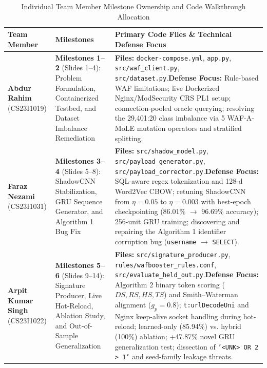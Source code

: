 \documentclass[conference]{IEEEtran}
\begin{document}
\begin{table}[t]
\centering
\caption{Individual Team Member Milestone Ownership and Code Walkthrough Allocation}
\label{tab:contributions}
\scriptsize
\begin{tabular}{L{3.2cm}L{5.2cm}L{8.4cm}}
\toprule
Team Member & Milestones & Primary Code Files \& Technical Defense Focus\\
\midrule
\textbf{Abdur Rahim} (CS23I1019) & \textbf{Milestones 1--2} (Slides 1--4): Problem Formulation, Containerized Testbed, and Dataset Imbalance Remediation & \textbf{Files:} \texttt{docker-compose.yml}, \texttt{app.py}, \texttt{src/waf\_client.py}, \texttt{src/dataset.py}.\newline \textbf{Defense Focus:} Rule-based WAF limitations; live Dockerized Nginx/ModSecurity CRS PL1 setup; connection-pooled oracle querying; resolving the 29,401:20 class imbalance via 5 WAF-A-MoLE mutation operators and stratified splitting.\\
\midrule
\textbf{Faraz Nezami} (CS23I1031) & \textbf{Milestones 3--4} (Slides 5--8): ShadowCNN Stabilization, GRU Sequence Generator, and Algorithm 1 Bug Fix & \textbf{Files:} \texttt{src/shadow\_model.py}, \texttt{src/payload\_generator.py}, \texttt{src/payload\_corrector.py}.\newline \textbf{Defense Focus:} SQL-aware regex tokenization and 128-d Word2Vec CBOW; retuning ShadowCNN from $\eta=0.05$ to $\eta=0.003$ with best-epoch checkpointing (86.01\% $\to$ 96.69\% accuracy); 256-unit GRU training; discovering and repairing the Algorithm 1 identifier corruption bug (\texttt{username} $\to$ \texttt{SELECT}).\\
\midrule
\textbf{Arpit Kumar Singh} (CS23I1022) & \textbf{Milestones 5--6} (Slides 9--14): Signature Producer, Live Hot-Reload, Ablation Study, and Out-of-Sample Generalization & \textbf{Files:} \texttt{src/signature\_producer.py}, \texttt{rules/wafbooster\_rules.conf}, \texttt{src/evaluate\_held\_out.py}.\newline \textbf{Defense Focus:} Algorithm 2 binary token scoring ($DS, RS, HS, TS$) and Smith--Waterman alignment ($g_p=0.8$); \texttt{t:urlDecodeUni} and Nginx keep-alive socket handling during hot-reload; learned-only (85.94\%) vs. hybrid (100\%) ablation; +47.87\% novel GRU generalization test; dissection of \texttt{'<UNK> OR 2 > 1'} and seed-family leakage threats.\\
\bottomrule
\end{tabular}
\end{table}
\end{document}
